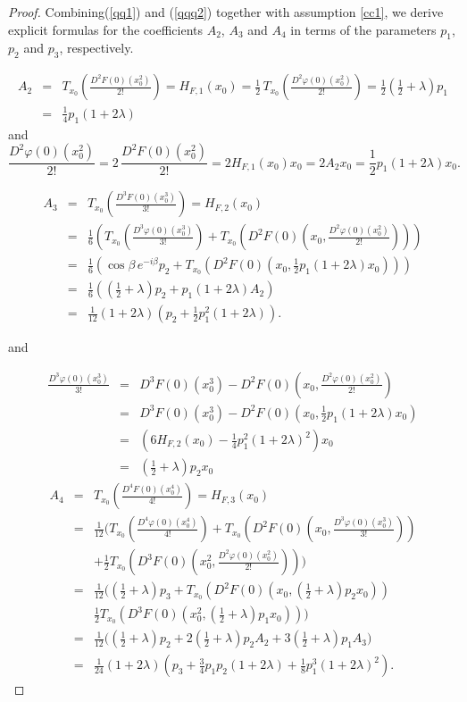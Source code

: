 \documentclass[11pt, reqno]{amsart}
\numberwithin{equation}{section}
\newcommand{\beas}{\begin{eqnarray*}}
\newcommand{\eeas}{\end{eqnarray*}}
\newcommand{\bea}{\begin{eqnarray}}
\newcommand{\eea}{\end{eqnarray}}
\begin{document}
\begin{proof}
Combining(\ref{qq1}) and (\ref{qqq2}) together with assumption \eqref{cc1}, we derive explicit formulas for the coefficients \(A_2\), \(A_3\)  and \(A_4\) in terms of the parameters \(p_1\), \(p_2\) and  \(p_3\), respectively.


\bea\label{A2}A_2&=&T_{x_0}\!\left(\frac{D^2F(0)(x_0^2)}{2!}\right)=H_{F,1}(x_0)
=\frac{1}{2}\,T_{x_0}\!\left(\frac{D^2\varphi(0)(x_0^2)}{2!}\right)
=\frac{1}{2}\left(\frac{1}{2}+\lambda\right)p_1\nonumber\\
&=&\frac{1}{4}p_1(1+2\lambda)
\eea
and
\[
\frac{D^2\varphi(0)(x_0^2)}{2!}=2\,\frac{D^2F(0)(x_0^2)}{2!}=2H_{F,1}(x_0)x_0
=2A_2x_0
=\frac{1}{2}p_1(1+2\lambda)x_0.
\]

\bea\label{A3} A_3&=&T_{x_0}\!\left(\frac{D^3F(0)(x_0^3)}{3!}\right)
=H_{F,2}(x_0) \nonumber\\
&=&\frac{1}{6}\left(T_{x_0}\!\left(\frac{D^3\varphi(0)(x_0^3)}{3!}\right)
+T_{x_0}\!\left(D^2F(0)\!\left(x_0,\frac{D^2\varphi(0)(x_0^2)}{2!}\right)\right)\right) \nonumber\\
&=&\frac{1}{6}\left(\cos\beta\,e^{-i\beta}p_2+T_{x_0}\!\left(D^2F(0)(x_0,\frac{1}{2}p_1(1+2\lambda)x_0)\right)\right) \nonumber\\
&=&\frac{1}{6}\left(\left(\frac{1}{2}+\lambda\right)p_2+p_1(1+2\lambda)A_2\right)\nonumber\\
&=&\frac{1}{12}(1+2\lambda)\left(p_2+\frac{1}{2}p_1^2(1+2\lambda)\right).
\eea

and

\beas 
\frac{D^3\varphi(0)(x_0^3)}{3!}&=&D^3F(0)(x_0^3)-D^2F(0)\!\left(x_0,\frac{D^2\varphi(0)(x_0^2)}{2!}\right)\\
&=&D^3F(0)(x_0^3)-D^2F(0)(x_0,\frac{1}{2}p_1(1+2\lambda)x_0)\\
&=&\left(6H_{F,2}(x_0)-\frac{1}{4}p_1^2(1+2\lambda)^2\right)x_0\\
&=&\left(\frac{1}{2}+\lambda\right)p_2x_0\eeas
\bea\label{A4}
A_4&=& T_{x_0}\!\left(\frac{D^4F(0)(x_0^4)}{4!}\right)=H_{F,3}(x_0) \nonumber\\
&=&\frac{1}{12}\Bigg(T_{x_0}\!\left(\frac{D^4\varphi(0)(x_0^4)}{4!}\right)+T_{x_0}\!\left(D^2F(0)\!\left(x_0,\frac{D^3\varphi(0)(x_0^3)}{3!}\right)\right) \nonumber\\
&& +\frac{1}{2}T_{x_0}\!\left(D^3F(0)\!\left(x_0^2,\frac{D^2\varphi(0)(x_0^2)}{2!}\right)\right)\Bigg) \nonumber\\
&=&\frac{1}{12}\Bigg(\left(\frac{1}{2}+\lambda\right)p_3+
T_{x_0}\!\left(D^2F(0)(x_0,\left(\frac{1}{2}+\lambda\right)p_2x_0)\right) \nonumber\\
&&\frac{1}{2}T_{x_0}\!\left(D^3F(0)(x_0^2,\left(\frac{1}{2}+\lambda\right)p_1x_0)\right)\Bigg) \nonumber\\
&=&\frac{1}{12}\Bigg(\left(\frac{1}{2}+\lambda\right)p_2+2\left(\frac{1}{2}+\lambda\right)p_2A_2+3\left(\frac{1}{2}+\lambda\right)p_1A_3\Big) \nonumber\\
&=&\frac{1}{24}(1+2\lambda)\left(p_3+\frac{3}{4}p_1p_2(1+2\lambda)+\frac{1}{8}p_1^3(1+2\lambda)^2\right).\eea
\end{proof}
\end{document}
